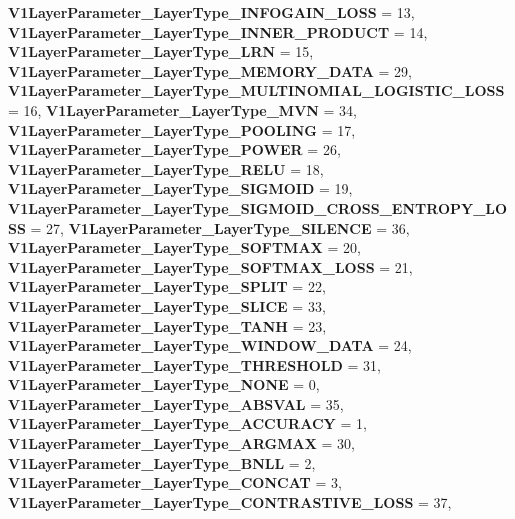 \begin{DoxyCompactItemize}
{\bfseries V1\+Layer\+Parameter\+\_\+\+Layer\+Type\+\_\+\+I\+N\+F\+O\+G\+A\+I\+N\+\_\+\+L\+O\+SS} = 13, 
{\bfseries V1\+Layer\+Parameter\+\_\+\+Layer\+Type\+\_\+\+I\+N\+N\+E\+R\+\_\+\+P\+R\+O\+D\+U\+CT} = 14, 
{\bfseries V1\+Layer\+Parameter\+\_\+\+Layer\+Type\+\_\+\+L\+RN} = 15, 
\newline
{\bfseries V1\+Layer\+Parameter\+\_\+\+Layer\+Type\+\_\+\+M\+E\+M\+O\+R\+Y\+\_\+\+D\+A\+TA} = 29, 
{\bfseries V1\+Layer\+Parameter\+\_\+\+Layer\+Type\+\_\+\+M\+U\+L\+T\+I\+N\+O\+M\+I\+A\+L\+\_\+\+L\+O\+G\+I\+S\+T\+I\+C\+\_\+\+L\+O\+SS} = 16, 
{\bfseries V1\+Layer\+Parameter\+\_\+\+Layer\+Type\+\_\+\+M\+VN} = 34, 
{\bfseries V1\+Layer\+Parameter\+\_\+\+Layer\+Type\+\_\+\+P\+O\+O\+L\+I\+NG} = 17, 
\newline
{\bfseries V1\+Layer\+Parameter\+\_\+\+Layer\+Type\+\_\+\+P\+O\+W\+ER} = 26, 
{\bfseries V1\+Layer\+Parameter\+\_\+\+Layer\+Type\+\_\+\+R\+E\+LU} = 18, 
{\bfseries V1\+Layer\+Parameter\+\_\+\+Layer\+Type\+\_\+\+S\+I\+G\+M\+O\+ID} = 19, 
{\bfseries V1\+Layer\+Parameter\+\_\+\+Layer\+Type\+\_\+\+S\+I\+G\+M\+O\+I\+D\+\_\+\+C\+R\+O\+S\+S\+\_\+\+E\+N\+T\+R\+O\+P\+Y\+\_\+\+L\+O\+SS} = 27, 
\newline
{\bfseries V1\+Layer\+Parameter\+\_\+\+Layer\+Type\+\_\+\+S\+I\+L\+E\+N\+CE} = 36, 
{\bfseries V1\+Layer\+Parameter\+\_\+\+Layer\+Type\+\_\+\+S\+O\+F\+T\+M\+AX} = 20, 
{\bfseries V1\+Layer\+Parameter\+\_\+\+Layer\+Type\+\_\+\+S\+O\+F\+T\+M\+A\+X\+\_\+\+L\+O\+SS} = 21, 
{\bfseries V1\+Layer\+Parameter\+\_\+\+Layer\+Type\+\_\+\+S\+P\+L\+IT} = 22, 
\newline
{\bfseries V1\+Layer\+Parameter\+\_\+\+Layer\+Type\+\_\+\+S\+L\+I\+CE} = 33, 
{\bfseries V1\+Layer\+Parameter\+\_\+\+Layer\+Type\+\_\+\+T\+A\+NH} = 23, 
{\bfseries V1\+Layer\+Parameter\+\_\+\+Layer\+Type\+\_\+\+W\+I\+N\+D\+O\+W\+\_\+\+D\+A\+TA} = 24, 
{\bfseries V1\+Layer\+Parameter\+\_\+\+Layer\+Type\+\_\+\+T\+H\+R\+E\+S\+H\+O\+LD} = 31, 
\newline
{\bfseries V1\+Layer\+Parameter\+\_\+\+Layer\+Type\+\_\+\+N\+O\+NE} = 0, 
{\bfseries V1\+Layer\+Parameter\+\_\+\+Layer\+Type\+\_\+\+A\+B\+S\+V\+AL} = 35, 
{\bfseries V1\+Layer\+Parameter\+\_\+\+Layer\+Type\+\_\+\+A\+C\+C\+U\+R\+A\+CY} = 1, 
{\bfseries V1\+Layer\+Parameter\+\_\+\+Layer\+Type\+\_\+\+A\+R\+G\+M\+AX} = 30, 
\newline
{\bfseries V1\+Layer\+Parameter\+\_\+\+Layer\+Type\+\_\+\+B\+N\+LL} = 2, 
{\bfseries V1\+Layer\+Parameter\+\_\+\+Layer\+Type\+\_\+\+C\+O\+N\+C\+AT} = 3, 
{\bfseries V1\+Layer\+Parameter\+\_\+\+Layer\+Type\+\_\+\+C\+O\+N\+T\+R\+A\+S\+T\+I\+V\+E\+\_\+\+L\+O\+SS} = 37, 

\end{DoxyCompactItemize}
